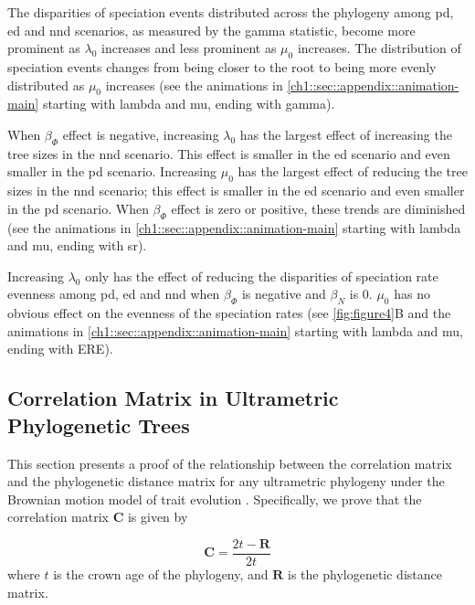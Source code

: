 {The disparities of speciation events distributed across the phylogeny among \acrshort{pd}, \acrshort{ed} and \acrshort{nnd} scenarios, as measured by the gamma statistic, become more prominent as $\lambda_0$ increases and less prominent as $\mu_0$ increases. The distribution of speciation events changes from being closer to the root to being more evenly distributed as $\mu_0$ increases (see the animations in \autoref{ch1::sec::appendix::animation-main} starting with lambda and mu, ending with \acrshort{gamma}). 

When $\beta_\varPhi$ effect is negative, increasing $\lambda_0$ has the largest effect of increasing the tree sizes in the \acrshort{nnd} scenario. This effect is smaller in the \acrshort{ed} scenario and even smaller in the \acrshort{pd} scenario. Increasing $\mu_0$ has the largest effect of reducing the tree sizes in the \acrshort{nnd} scenario; this effect is smaller in the \acrshort{ed} scenario and even smaller in the \acrshort{pd} scenario. When $\beta_\varPhi$ effect is zero or positive, these trends are diminished (see the animations in \autoref{ch1::sec::appendix::animation-main} starting with lambda and mu, ending with \acrshort{sr}).

Increasing $\lambda_0$ only has the effect of reducing the disparities of speciation rate evenness among \acrshort{pd}, \acrshort{ed} and \acrshort{nnd} when $\beta_\varPhi$ is negative and $\beta_N$ is 0. $\mu_0$ has no obvious effect on the evenness of the speciation rates (see \autoref{fig:figure4}B and the animations in \autoref{ch1::sec::appendix::animation-main} starting with lambda and mu, ending with ERE).

\clearpage
\subsection{Correlation Matrix in Ultrametric Phylogenetic Trees}
\label{ch1::sec::appendix::proof}

\newtheorem{definition}{Definition}
\newtheorem*{theorem}{Theorem}
This section presents a proof of the relationship between the correlation matrix and the phylogenetic distance matrix for any ultrametric phylogeny under the Brownian motion model of trait evolution \citep{felsenstein_phylogenies_1985, martins_phylogenies_1997}. Specifically, we prove that the correlation matrix \( \boldsymbol{C} \) is given by

\begin{equation}
    \boldsymbol{C} = \frac{2t - \boldsymbol{R}}{2t}
    \label{eq:correlation_distance_relationship}
\end{equation}
where \( t \) is the crown age of the phylogeny, and \( \boldsymbol{R} \) is the phylogenetic distance matrix.

}

